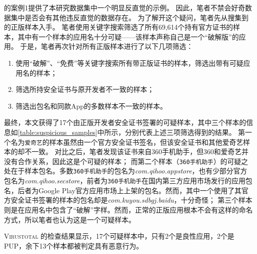 的案例1提供了本研究数据集中一个明显反直觉的示例。
因此，笔者不禁会好奇数据集中是否会有其他违反直觉的数据存在。
为了解开这个疑问，笔者先从搜集到的正版样本入手。
笔者使用关键字搜索筛选了所有69,614个持有官方证书的样本，其中有一个样本的应用名十分可疑——该样本声称自己是一个``破解版''的应用。
于是，笔者再次针对所有正版样本进行了以下几项筛选：
\begin{enumerate}
    \item 使用``破解''、``免费''等关键字搜索所有带正版证书的样本，筛选出带有可疑应用名的样本；
    \item 筛选所持安全证书与原开发者不一致的样本；
    \item 筛选出包名和同款App的多数样本不一致的样本。
\end{enumerate}

最终，本文获得了17个由正版开发者安全证书签署的可疑样本，其中三个样本的信息如\autoref{table:suspicious_samples}中所示，分别代表上述三项筛选得到的结果。
第一个名为\texttt{爱奇艺}的样本虽然由一个官方安全证书签名，但该安全证书和其他爱奇艺样本的却不一致。
对比之后，笔者发现该证书来自360手机助手，但360和爱奇艺并没有合作关系，因此这是个可疑的样本；
而第二个样本（\texttt{360手机助手}）的可疑之处在于样本包名。多数\texttt{360手机助手}的包名为\emph{com.qihoo.appstore}，也有少部分官方包名为\emph{com.qihoo.secstore}，前者为\texttt{360手机助手}在国内第三方应用市场发行的应用包名，后者为Google Play官方应用市场上上架的包名。然而，其中一个使用了其官方安全证书签署的样本的包名却是\emph{com.kuyou.sdbgj.baidu}，十分奇怪；
第三个样本则是在应用名中包含了``破解''字样。然而，正常的正版应用根本不会有这样的命名方式，所以笔者也认为这是一个可疑样本。

\textsc{Virustotal} 的检查结果显示，17个可疑样本中，只有2个是良性应用，2个是PUP，余下13个样本都被判定具有恶意行为。

